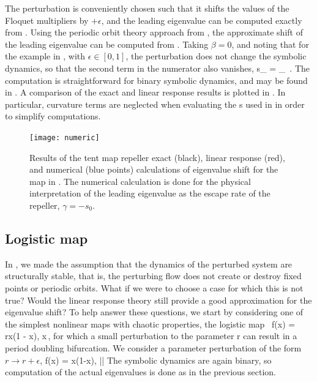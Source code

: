 \documentclass[aps,pre,
                showpacs,
                twocolumn,
                groupedaddress,
                superscriptaddress,
                floatfix]{revtex4-1}
\begin{document}
    
The perturbation is
conveniently chosen such that it shifts the values of the Floquet
multipliers by $+\epsilon$, and the leading eigenvalue can be computed
exactly from . Using the periodic orbit theory approach from
, the approximate shift of the leading
eigenvalue can be computed from . Taking $\beta=0$,
and noting that for the example in , with
$\epsilon\in [0,1]$, the perturbation does not change the symbolic
dynamics, so that the second term in the numerator also vanishes,
\beq
\delta s_{\alpha}
  = 
    _{\zeta}
\,.
\eeq
The computation is straightforward for binary symbolic dynamics, and may
be found in . A comparison of the exact
and linear response results is plotted in . In
particular, curvature terms are neglected when evaluating the {\cycForm
s} used in  in order to simplify computations.

\begin{figure}[htbp]
\texttt{[image: numeric]}
    \caption{\label{fig:numeric}
Results of the tent map repeller exact (black), linear response (red),
and numerical (blue points) calculations of eigenvalue shift for the map
in .
The numerical calculation is done for
the physical interpretation of the leading eigenvalue as the escape rate
of the repeller, $\gamma = -s_{0}$.
    }
\end{figure}

\subsection{Logistic map}
\label{sect:logstMap}

In , we made the assumption that the dynamics of the
perturbed system are structurally stable, that is, the perturbing flow
does not create or destroy fixed points or periodic orbits. What if we
were to choose a case for which this is not true? Would the linear
response theory still provide a good approximation for the eigenvalue
shift? To help answer these questions, we start by considering one of the
simplest nonlinear maps with chaotic properties, the logistic map\
\beq
f(x) = rx(1 - x), x\in [0, 1]
\,,
for which a small perturbation to the parameter r can result in a period
doubling bifurcation. We consider a parameter perturbation of the form
$r \to r+\epsilon$,
\beq
\epsilon \delta f(x) = \epsilon x(1-x), |\epsilon|
\eeq
The symbolic dynamics are again binary, so computation of the actual
eigenvalues is done as in the previous section.
\end{document}
